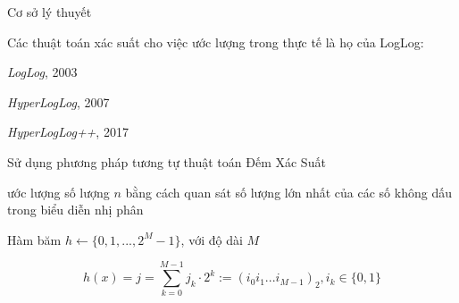 \documentclass[10pt]{beamer}
\newcommand{\SubItem}[1]{
    {\setlength\itemindent{15pt} \item[-] #1}
}
\begin{document}
\begin{frame}[fragile]{Cơ sở lý thuyết}
\begin{itemize}
  \item Các thuật toán xác suất cho việc ước lượng trong thực tế là họ của LogLog:
  \SubItem{\textit{LogLog}, 2003}
  \SubItem{\textit{HyperLogLog}, 2007}
  \SubItem{\textit{HyperLogLog++}, 2017}
  \item Sử dụng phương pháp tương tự thuật toán Đếm Xác Suất
  \SubItem{ước lượng số lượng $n$ bằng cách quan sát số lượng lớn nhất của các số không dấu
  trong biểu diễn nhị phân}
  \SubItem{Hàm băm $h \gets \{0,1,...,2^M-1\}$, với độ dài $M$}
\end{itemize}

\[
    h(x) = j = \sum\limits_{k=0}^{M-1}j_k\cdot2^k := \left(i_0i_1...i_{M-1}\right)_2,i_k \in \{0,1\}
\]
\end{frame}
\end{document}
